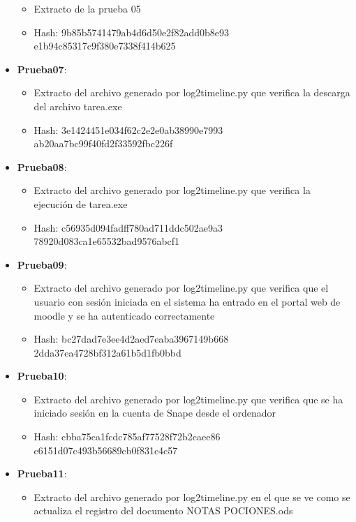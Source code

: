\begin{itemize}
{\begin{itemize}
      \item{Extracto de la prueba 05}
      \item{Hash}: 9b85b5741479ab4d6d50e2f82add0b8e93\\e1b94c85317c9f380e7338f414b625
    \end{itemize}}
  \item{\textbf{Prueba07}: 
    \begin{itemize}
      \item{Extracto del archivo generado por log2timeline.py que verifica la descarga del archivo tarea.exe}
      \item{Hash}: 3e1424451e034f62c2e2e0ab38990e7993\\ab20aa7bc99f40fd2f33592fbc226f
    \end{itemize}}
  \item{\textbf{Prueba08}: 
    \begin{itemize}
      \item{Extracto del archivo generado por log2timeline.py que verifica la ejecución de tarea.exe}
      \item{Hash}: c56935d094fadff780ad711ddc502ae9a3\\78920d083ca1e65532bad9576abcf1
    \end{itemize}}
  \item{\textbf{Prueba09}: 
    \begin{itemize}
      \item{Extracto del archivo generado por log2timeline.py que verifica que el usuario con sesión iniciada en el sistema ha entrado en el portal web de moodle y se ha autenticado correctamente}
      \item{Hash}: bc27dad7e3ee4d2aed7eaba3967149b668\\2dda37ea4728bf312a61b5d1fb0bbd
    \end{itemize}}
  \item{\textbf{Prueba10}: 
    \begin{itemize}
      \item{Extracto del archivo generado por log2timeline.py que verifica que se ha iniciado sesión en la cuenta de Snape desde el ordenador}
      \item{Hash}: cbba75ca1fcdc785af77528f72b2caee86\\c6151d07c493b56689cb0f831c4c57
    \end{itemize}}
  \item{\textbf{Prueba11}: 
    \begin{itemize}
      \item{Extracto del archivo generado por log2timeline.py en el que se ve como se actualiza el registro del documento NOTAS POCIONES.ods}

\end{itemize}}
\end{itemize}
